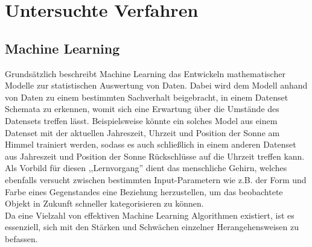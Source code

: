 \chapter{\textbf{Untersuchte Verfahren}}

\section{Machine Learning}\label{unterkapitel}

Grundsätzlich beschreibt Machine Learning das Entwickeln mathematischer Modelle zur statistischen Auswertung
von Daten. Dabei wird dem Modell anhand von Daten zu einem bestimmten Sachverhalt beigebracht, in einem 
Datenset Schemata zu erkennen, womit sich eine Erwartung über die Umstände des Datensets treffen lässt.
Beispielsweise könnte ein solches Model aus einem Datenset mit der aktuellen Jahreszeit, Uhrzeit und 
Position der Sonne am Himmel trainiert werden, sodass es auch schließlich in einem anderen Datenset 
aus Jahreszeit und Position der Sonne Rückschlüsse auf die Uhrzeit treffen kann.\\
Als Vorbild für diesen ,,Lernvorgang'' dient das menschliche Gehirn, welches ebenfalls versucht zwischen 
bestimmten Input-Parametern wie z.B. der Form und Farbe eines Gegenstandes eine Beziehung herzustellen,
um das beobachtete Objekt in Zukunft schneller kategorisieren zu können.\\
Da eine Vielzahl von effektiven Machine Learning Algorithmen existiert, ist es essenziell, sich mit den
Stärken und Schwächen einzelner Herangehensweisen zu befassen.\newpage

